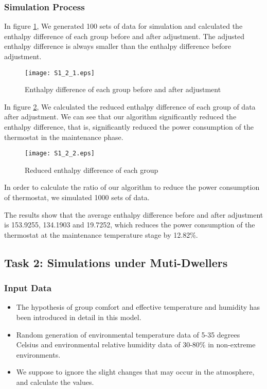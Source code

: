 \documentclass{mcmthesis}
\begin{document}
			\subsubsection{Simulation Process}
			
				In figure \ref{fig:2}, We generated 100 sets of data for simulation and calculated the enthalpy difference of each group before and after adjustment. The adjusted enthalpy difference is always smaller than the enthalpy difference before adjustment.
				
				\begin{figure}[h]
					\small
					\centering
					\texttt{[image: S1\_2\_1.eps]}
					\caption{Enthalpy difference of each group before and after adjustment} \label{fig:2}
				\end{figure}
			
				In figure \ref{fig:2.1}, We calculated the reduced enthalpy difference of each group of data after adjustment. We can see that our algorithm significantly reduced the enthalpy difference, that is, significantly reduced the power consumption of the thermostat in the maintenance phase.
				
				\begin{figure}[h]
					\small
					\centering
					\texttt{[image: S1\_2\_2.eps]}
					\caption{Reduced enthalpy difference of each group} \label{fig:2.1}
				\end{figure}
			
				In order to calculate the ratio of our algorithm to reduce the power consumption of thermostat, we simulated 1000 sets of data.
				
				The results show that the average enthalpy difference before and after adjustment is 153.9255, 134.1903 and 19.7252, which reduces the power consumption of the thermostat at the maintenance temperature stage by 12.82\%.
			
			
		\subsection{Task 2: Simulations under Muti-Dwellers}
			\subsubsection{Input Data}	
				\begin{itemize}
					\item The hypothesis of group comfort and effective temperature and humidity has been introduced in detail in this model.
					
					\item Random generation of environmental temperature data of 5-35 degrees Celsius and environmental relative humidity data of 30-80\% in non-extreme environments.
					
					\item We suppose to ignore the slight changes that may occur in the atmosphere, and calculate the values.
				\end{itemize}	
				
\end{document}

